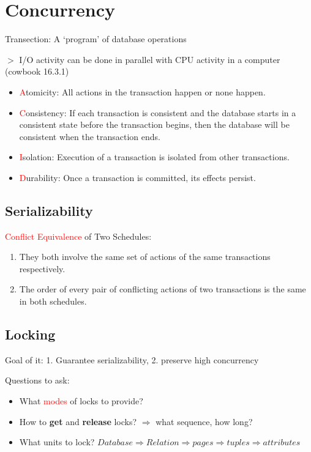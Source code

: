 \documentclass[12pt,a4paper]{article}
\newcommand{\remark}[1]{
    $>$ {\color{blue} #1}
}
\begin{document}
\section*{Concurrency}

Transection: A `program' of database operations

\remark{I/O activity can be done in parallel with CPU activity in a computer (cowbook 16.3.1)}

\begin{itemize}
    \item \textcolor{red}{A}tomicity: All actions in the transaction happen or none happen.
    \item \textcolor{red}{C}onsistency: If each transaction is consistent and the database starts in a consistent state before the transaction begins, 
                                        then the database will be consistent when the transaction ends.
    \item \textcolor{red}{I}solation: Execution of a transaction is isolated from other transactions.
    \item \textcolor{red}{D}urability: Once a transaction is committed, its effects persist.
\end{itemize}

\subsection*{Serializability}

\textcolor{red}{Conflict Equivalence} of Two Schedules: 

\begin{enumerate}
    \item They both involve the same set of actions of the same transactions respectively.
    \item The order of every pair of conflicting actions of two transactions is the same in both schedules.
\end{enumerate}

\subsection*{Locking}

Goal of it: 1. Guarantee serializability, 2. preserve high concurrency

Questions to ask:

\begin{itemize}
    \item What \textcolor{red}{modes} of locks to provide?
    \item How to \textbf{get} and \textbf{release} locks? $\Rightarrow$ what sequence, how long?
    \item What units to lock? \(Database \Rightarrow Relation \Rightarrow pages \Rightarrow tuples \Rightarrow attributes\)
\end{itemize}
\end{document}
